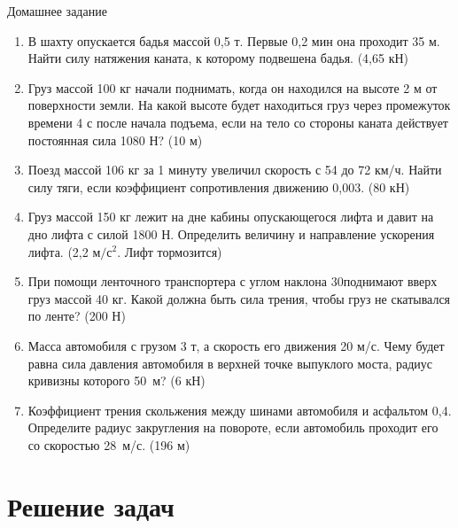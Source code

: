 \documentclass[a6paper, 11pt]{diss_4}
\renewcommand{\'}{\,'}
\begin{document}
\begin{center}
   Домашнее задание
\end{center}
\begin{enumerate}

\item В шахту опускается бадья массой 0,5 т. Первые 0,2 мин она проходит 35 м. Найти силу натяжения каната, к которому подвешена бадья. (4,65 кН)

\item Груз массой 100 кг начали поднимать, когда он находился на высоте 2 м от поверхности земли. На какой высоте будет находиться груз через промежуток времени 4 с после начала подъема, если на тело со стороны каната действует постоянная сила 1080 Н?
(10 м)

\item Поезд массой 106 кг за 1 минуту увеличил скорость с 54 до 72 км/ч. Найти силу тяги, если коэффициент сопротивления движению 0,003. (80 кН)

\item Груз массой 150 кг лежит на дне кабины опускающегося лифта и давит на дно лифта с силой 1800 Н. Определить величину и направление ускорения лифта. (2,2 $м/с^2$. Лифт тормозится)

\item При помощи ленточного транспортера с углом наклона 30\textdegree поднимают вверх груз массой 40 кг. Какой должна быть сила трения, чтобы груз не скатывался по ленте? (200 Н)

\item Масса автомобиля с грузом 3 т, а скорость его движения 20 м/с. Чему будет равна сила давления автомобиля в верхней точке выпуклого моста, радиус кривизны которого 50 м? (6 кН)

\item Коэффициент трения скольжения между шинами автомобиля и асфальтом 0,4. Определите радиус закругления на повороте, если автомобиль проходит его со скоростью 28 м/с. (196 м)

\end{enumerate}


\section{Решение задач}
\end{document}
